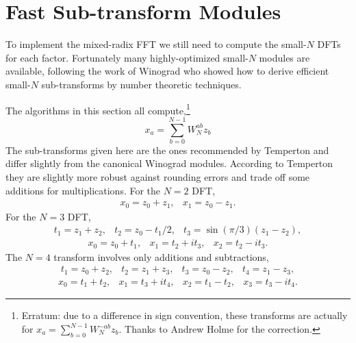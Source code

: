 \documentclass[fleqn,12pt]{article}
\begin{document}
\section{Fast Sub-transform Modules}
%
To implement the mixed-radix FFT we still need to compute the
small-$N$ DFTs for each factor. Fortunately many highly-optimized
small-$N$ modules are available, following the work of Winograd who
showed how to derive efficient small-$N$ sub-transforms by number
theoretic techniques.

The algorithms in this section all compute,\footnote{Erratum: due to a difference in sign convention, these transforms are actually for $x_a = \sum_{b=0}^{N-1} W_N^{-ab} z_b$.  Thanks to Andrew Holme for the correction.}
%
\begin{equation}
x_a = \sum_{b=0}^{N-1} W_N^{ab} z_b
\end{equation}
%
The sub-transforms given here are the ones recommended by Temperton
and differ slightly from the canonical Winograd modules. According to
Temperton~\cite{temperton83} they are slightly more robust against
rounding errors and trade off some additions for multiplications.
%
For the $N=2$ DFT,
%
\begin{equation}
\begin{array}{ll}
x_0 = z_0 + z_1, &
x_1 = z_0 - z_1. 
\end{array}
\end{equation}
%
For the $N=3$ DFT,
%
\begin{equation}
\begin{array}{lll}
t_1 = z_1 + z_2, &
t_2 = z_0 - t_1/2, &
t_3 = \sin(\pi/3) (z_1 - z_2), 
\end{array}
\end{equation}
\begin{equation}
\begin{array}{lll}
x_0 = z_0 + t_1, &
x_1 = t_2 + i t_3, &
x_2 = t_2 - i t_3. 
\end{array}
\end{equation}
%
The $N=4$ transform involves only additions and subtractions,
%
\begin{equation}
\begin{array}{llll}
t_1 = z_0 + z_2, &
t_2 = z_1 + z_3, &
t_3 = z_0 - z_2, &
t_4 = z_1 - z_3,
\end{array}
\end{equation}
\begin{equation}
\begin{array}{llll}
x_0 = t_1 + t_2, &
x_1 = t_3 + i t_4, &
x_2 = t_1 - t_2, &
x_3 = t_3 - i t_4.
\end{array}
\end{equation}
\end{document}

